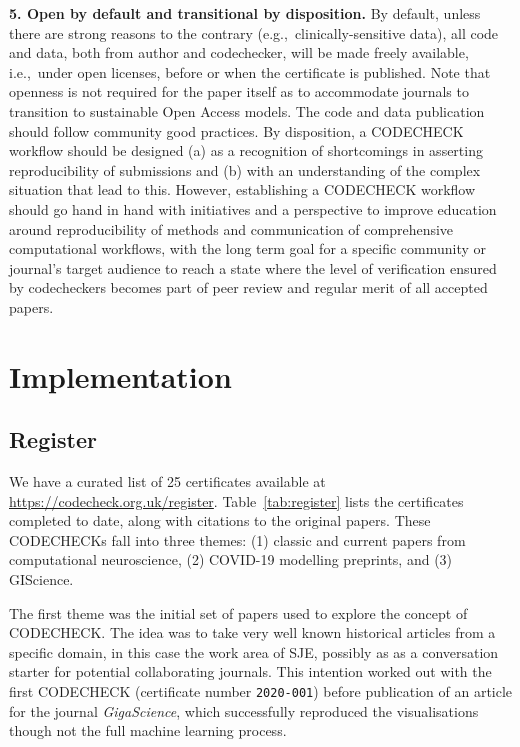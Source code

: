 \documentclass[12pt]{article}
\begin{document}
\textbf{5. Open by default and transitional by disposition.} %
By default, unless there are strong
reasons to the contrary (e.g.,~clinically-sensitive data), all code and
data, both from author and codechecker, will be made freely available, 
i.e.,~under open licenses, before or when the certificate is published.
Note that openness is not required for the paper itself as to accommodate 
journals to transition to sustainable Open Access models.
The code and data publication should follow community good practices.
By disposition, a CODECHECK workflow should be designed (a) as a recognition of
shortcomings in asserting reproducibility of submissions and (b)
with an understanding of the
complex situation that lead to this. However, establishing a CODECHECK workflow
should go hand in hand with initiatives and a perspective to improve education
around reproducibility of methods and communication of comprehensive 
computational workflows, with the long term goal for a specific community or
journal's target audience to reach a state where the level of verification 
ensured by codecheckers becomes part of peer review and regular
merit of all accepted papers.

\section*{Implementation}\label{implementation}

\subsection*{Register}\label{register}

We have a curated list of 25 certificates available at
\url{https://codecheck.org.uk/register}.
Table~\ref{tab:register} lists the certificates completed to date,
along with citations to the original papers.
These CODECHECKs fall into three themes:
(1) classic and current papers from computational neuroscience,
(2) COVID-19 modelling preprints, and
(3) GIScience.  

The first theme was the initial set of papers used to explore the concept
of CODECHECK. 
The idea was to take very well known historical articles from a 
specific domain, in this case the work area of SJE, possibly 
as as a conversation starter for potential collaborating journals.
This intention worked out with the first CODECHECK (certificate number
\texttt{2020-001}) before publication of an article for the journal
\emph{GigaScience}, which successfully reproduced the visualisations
though not the full machine learning process.
\end{document}
